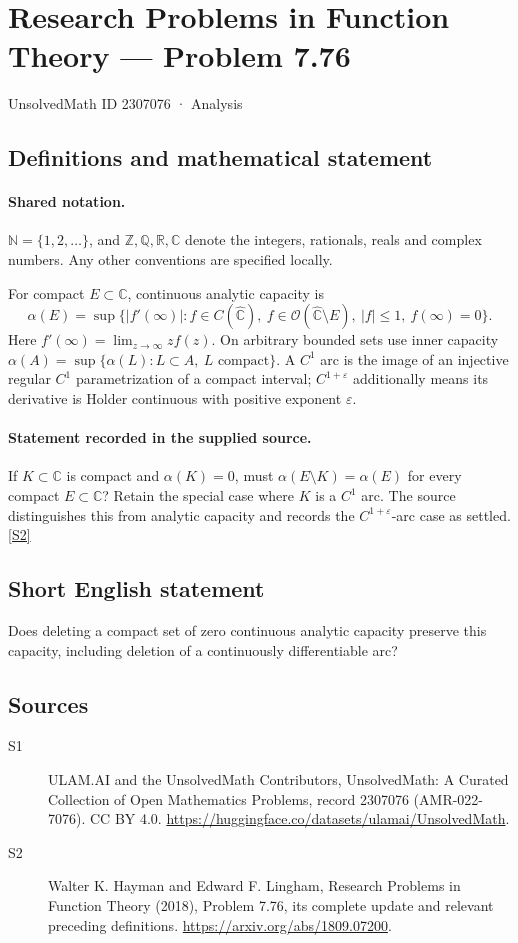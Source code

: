 \documentclass[11pt]{article}
\newcommand{\sref}[2]{\hyperlink{source:#1:#2}{[S#2]}}
\begin{document}
\setcounter{section}{2307075}
\section{Research Problems in Function Theory — Problem 7.76}\label{2307076}
{\small\sffamily UnsolvedMath ID 2307076 · Analysis}
\subsection{Definitions and mathematical statement}

\paragraph{Shared notation.}$\mathbb N=\{1,2,\ldots\}$, and $\mathbb Z,\mathbb Q,\mathbb R,\mathbb C$ denote the integers, rationals, reals and complex numbers. Any other conventions are specified locally.


For compact $E\subset\mathbb C$, continuous analytic capacity is
\[\alpha(E)=\sup\{|f'(\infty)|:f\in C(\widehat{\mathbb C}),\ f\in\mathcal O(\widehat{\mathbb C}\setminus E),\ |f|\le1,\ f(\infty)=0\}.
\]
Here $f'(\infty)=\lim_{z\to\infty}zf(z)$. On arbitrary bounded sets use inner capacity $\alpha(A)=\sup\{\alpha(L):L\subset A,\ L\text{ compact}\}$. A $C^1$ arc is the image of an injective regular $C^1$ parametrization of a compact interval; $C^{1+\varepsilon}$ additionally means its derivative is Holder continuous with positive exponent $\varepsilon$.
\paragraph{Statement recorded in the supplied source.}
If $K\subset\mathbb C$ is compact and $\alpha(K)=0$, must $\alpha(E\setminus K)=\alpha(E)$ for every compact $E\subset\mathbb C$? Retain the special case where $K$ is a $C^1$ arc. The source distinguishes this from analytic capacity and records the $C^{1+\varepsilon}$-arc case as settled. \sref{2307076}{2}
\subsection{Short English statement}
Does deleting a compact set of zero continuous analytic capacity preserve this capacity, including deletion of a continuously differentiable arc?
\subsection{Sources}
\begin{description}
\item[\hypertarget{source:2307076:1}{S1}] ULAM.AI and the UnsolvedMath Contributors, UnsolvedMath: A Curated Collection of Open Mathematics Problems, record 2307076 (AMR-022-7076). CC BY 4.0. \url{https://huggingface.co/datasets/ulamai/UnsolvedMath}.
\item[\hypertarget{source:2307076:2}{S2}] Walter K. Hayman and Edward F. Lingham, Research Problems in Function Theory (2018), Problem 7.76, its complete update and relevant preceding definitions. \url{https://arxiv.org/abs/1809.07200}.
\end{description}
\label{end:2307076}
\end{document}
